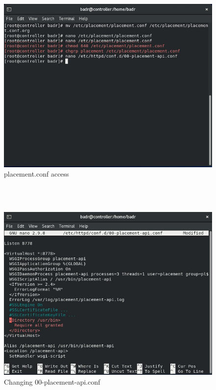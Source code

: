 \begin{spacing}{1.2}
\\
\begin{figure}[!htb] 
\begin{center} 
\includegraphics[width=1\linewidth]{Cloud/Installing and Configuring Nova services/placement.conf access} 
\end{center} 
\caption{placement.conf access} 
\end{figure}  \FloatBarrier 
\\
\\
\begin{figure}[!htb] 
\begin{center} 
\includegraphics[width=1\linewidth]{Cloud/Installing and Configuring Nova services/Changing 00-placement-api.conf} 
\end{center} 
\caption{Changing 00-placement-api.conf} 
\end{figure}  \FloatBarrier 
\\

\end{spacing}
